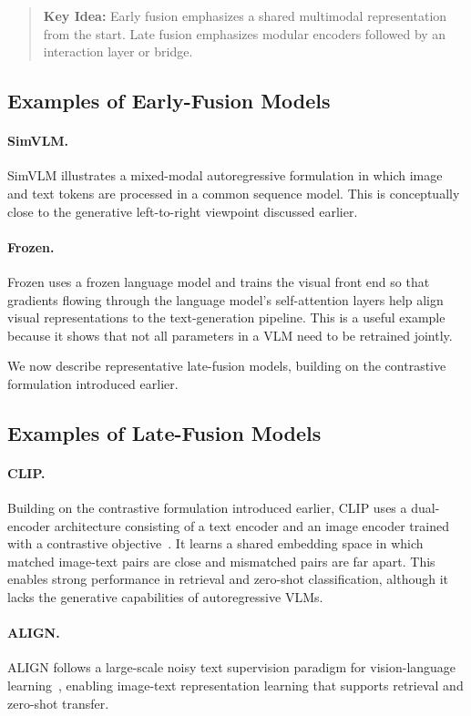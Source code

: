 \documentclass{article}
\newenvironment{keyidea}{\begin{quote}\noindent\textbf{Key Idea:} }{\end{quote}}
\begin{document}
\begin{keyidea}
Early fusion emphasizes a shared multimodal representation from the start. Late fusion emphasizes modular encoders followed by an interaction layer or bridge.
\end{keyidea}

\subsection{Examples of Early-Fusion Models}
\paragraph{SimVLM.} SimVLM illustrates a mixed-modal autoregressive formulation in which image and text tokens are processed in a common sequence model. This is conceptually close to the generative left-to-right viewpoint discussed earlier.

\paragraph{Frozen.} Frozen uses a frozen language model and trains the visual front end so that gradients flowing through the language model's self-attention layers help align visual representations to the text-generation pipeline. This is a useful example because it shows that not all parameters in a VLM need to be retrained jointly.

We now describe representative late-fusion models, building on the contrastive formulation introduced earlier.

\subsection{Examples of Late-Fusion Models}
\paragraph{CLIP.} Building on the contrastive formulation introduced earlier, CLIP uses a dual-encoder architecture consisting of a text encoder and an image encoder trained with a contrastive objective~\cite{radford2021}. It learns a shared embedding space in which matched image-text pairs are close and mismatched pairs are far apart. This enables strong performance in retrieval and zero-shot classification, although it lacks the generative capabilities of autoregressive VLMs.

\paragraph{ALIGN.} ALIGN follows a large-scale noisy text supervision paradigm for vision-language learning~\cite{jia2021}, enabling image-text representation learning that supports retrieval and zero-shot transfer.
\end{document}
